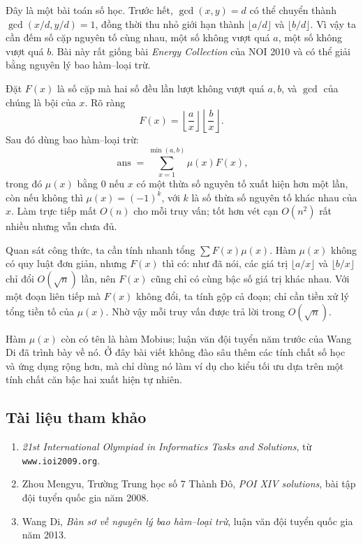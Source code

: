 \documentclass[11pt]{article}
\begin{document}
Đây là một bài toán số học. Trước hết,
\(\gcd(x,y)=d\) có thể chuyển thành \(\gcd(x/d,y/d)=1\), đồng thời thu nhỏ
giới hạn thành \(\lfloor a/d\rfloor\) và \(\lfloor b/d\rfloor\). Vì vậy ta cần
đếm số cặp nguyên tố cùng nhau, một số không vượt quá \(a\), một số không vượt
quá \(b\). Bài này rất giống bài \emph{Energy Collection} của NOI 2010 và có
thể giải bằng nguyên lý bao hàm--loại trừ.

Đặt \(F(x)\) là số cặp mà hai số đều lần lượt không vượt quá \(a,b\), và
\(\gcd\) của chúng là bội của \(x\). Rõ ràng
\[
  F(x)=\left\lfloor\frac a x\right\rfloor
       \left\lfloor\frac b x\right\rfloor.
\]
Sau đó dùng bao hàm--loại trừ:
\[
  \operatorname{ans}
  =\sum_{x=1}^{\min(a,b)} \mu(x)F(x),
\]
trong đó \(\mu(x)\) bằng \(0\) nếu \(x\) có một thừa số nguyên tố xuất hiện hơn
một lần, còn nếu không thì \(\mu(x)=(-1)^k\), với \(k\) là số thừa số nguyên tố
khác nhau của \(x\). Làm trực tiếp mất \(O(n)\) cho mỗi truy vấn; tốt hơn vét
cạn \(O(n^2)\) rất nhiều nhưng vẫn chưa đủ.

Quan sát công thức, ta cần tính nhanh tổng \(\sum F(x)\mu(x)\). Hàm \(\mu(x)\)
không có quy luật đơn giản, nhưng \(F(x)\) thì có: như đã nói, các giá trị
\(\lfloor a/x\rfloor\) và \(\lfloor b/x\rfloor\) chỉ đổi \(O(\sqrt n)\) lần,
nên \(F(x)\) cũng chỉ có cùng bậc số giá trị khác nhau. Với một đoạn liên tiếp
mà \(F(x)\) không đổi, ta tính gộp cả đoạn; chỉ cần tiền xử lý tổng tiền tố của
\(\mu(x)\). Nhờ vậy mỗi truy vấn được trả lời trong \(O(\sqrt n)\).

Hàm \(\mu(x)\) còn có tên là hàm Mobius; luận văn đội tuyển năm trước của Wang
Di đã trình bày về nó. Ở đây bài viết không đào sâu thêm các tính chất số học
và ứng dụng rộng hơn, mà chỉ dùng nó làm ví dụ cho kiểu tối ưu dựa trên một
tính chất căn bậc hai xuất hiện tự nhiên.

\subsection*{Tài liệu tham khảo}

\begin{enumerate}
  \item \emph{21st International Olympiad in Informatics Tasks and Solutions},
  từ \texttt{www.ioi2009.org}.
  \item Zhou Mengyu, Trường Trung học số 7 Thành Đô, \emph{POI XIV solutions},
  bài tập đội tuyển quốc gia năm 2008.
  \item Wang Di, \emph{Bàn sơ về nguyên lý bao hàm--loại trừ}, luận văn đội
  tuyển quốc gia năm 2013.
\end{enumerate}
\end{document}
